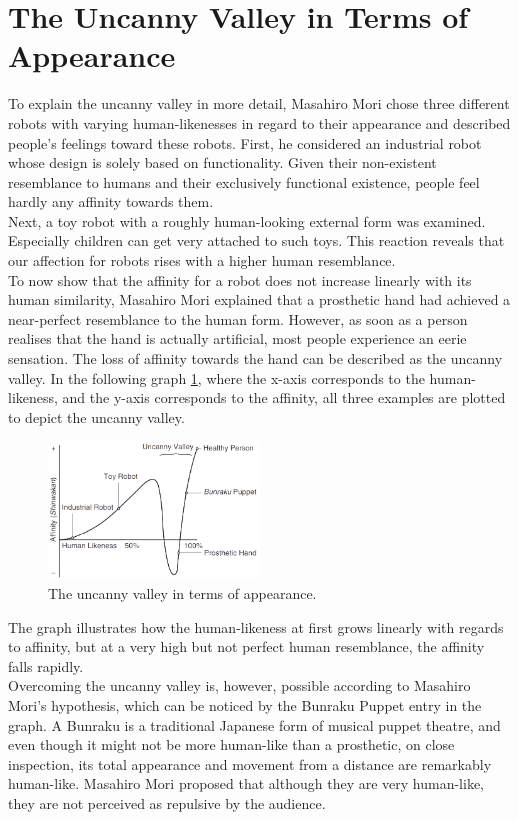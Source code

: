 \section{The Uncanny Valley in Terms of Appearance}
To explain the uncanny valley in more detail, Masahiro Mori \cite{original_masahiro} chose three different robots with varying human-likenesses in regard to their appearance and described people's feelings toward these robots. First, he considered an industrial robot whose design is solely based on functionality. Given their non-existent resemblance to humans and their exclusively functional existence, people feel hardly any affinity towards them.\\
Next, a toy robot with a roughly human-looking external form was examined. Especially children can get very attached to such toys. This reaction reveals that our affection for robots rises with a higher human resemblance.\\
To now show that the affinity for a robot does not increase linearly with its human similarity, Masahiro Mori explained that a prosthetic hand had achieved a near-perfect resemblance to the human form. However, as soon as a person realises that the hand is actually artificial, most people experience an eerie sensation. The loss of affinity towards the hand can be described as the uncanny valley.
In the following graph \ref{fig:uv_appearance}, where the x-axis corresponds to the human-likeness, and the y-axis corresponds to the affinity, all three examples are plotted to depict the uncanny valley. 
\begin{figure} %
    \centering
    \includegraphics[width=0.5\textwidth]{graphics/uv_appearance.png}
    \caption{The uncanny valley in terms of appearance.}
    \label{fig:uv_appearance}
\end{figure}
The graph illustrates how the human-likeness at first grows linearly with regards to affinity, but at a very high but not perfect human resemblance, the affinity falls rapidly.\\ 
Overcoming the uncanny valley is, however, possible according to Masahiro Mori's hypothesis, which can be noticed by the Bunraku Puppet entry in the graph. A Bunraku is a traditional Japanese form of musical puppet theatre, and even though it might not be more human-like than a prosthetic, on close inspection, its total appearance and movement from a distance are remarkably human-like. Masahiro Mori proposed that although they are very human-like, they are not perceived as repulsive by the audience.

